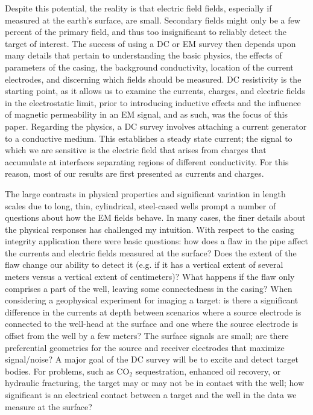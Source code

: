 Despite this potential, the reality is that electric field fields, especially if measured at the earth’s surface, are small. Secondary fields might only be a few percent of the primary field, and thus too insignificant to reliably detect the target of interest. The success of using a DC or EM survey then depends upon many details that pertain to understanding the basic physics, the effects of parameters of the casing, the background conductivity, location of the current electrodes, and discerning which fields should be measured. DC resistivity is the starting point, as it allows us to examine the currents, charges, and electric fields in the electrostatic limit, prior to introducing inductive effects and the influence of magnetic permeability in an EM signal, and as such, was the focus of this paper. Regarding the physics, a DC survey involves attaching a current generator to a conductive medium. This establishes a steady state current; the signal to which we are sensitive is the electric field that arises from charges that accumulate at interfaces separating regions of different conductivity. For this reason, most of our results are first presented as currents and charges.

The large contrasts in physical properties and significant variation in length scales due to long, thin, cylindrical, steel-cased wells prompt a number of questions about how the EM fields behave. In many cases, the finer details about the physical responses has challenged my intuition. With respect to the casing integrity application there were basic questions: how does a flaw in the pipe affect the currents and electric fields measured at the surface? Does the extent of the flaw change our ability to detect it (e.g. if it has a vertical extent of several meters versus a vertical extent of centimeters)? What happens if the flaw only comprises a part of the well, leaving some connectedness in the casing? When considering a geophysical experiment for imaging a target: is there a significant difference in the currents at depth between scenarios where a source electrode is connected to the well-head at the surface and one where the source electrode is offset from the well by a few meters? The surface signals are small; are there preferential geometries for the source and receiver electrodes that maximize signal/noise? A major goal of the DC survey will be to excite and detect target bodies. For problems, such as CO$_2$ sequestration, enhanced oil recovery, or hydraulic fracturing, the target may or may not be in contact with the well; how significant is an electrical contact between a target and the well in the data we measure at the surface?


